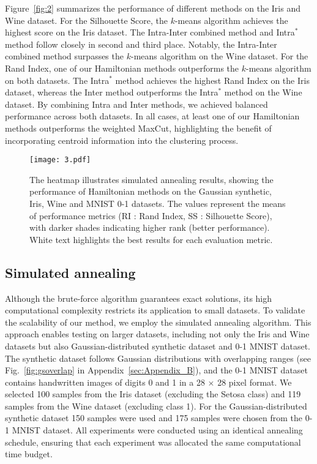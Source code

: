 \documentclass[showpacs,twocolumn,superscriptaddress]{revtex4-2}
\begin{document}
Figure~\ref{fig:2} summarizes the performance of different methods on the Iris and Wine dataset. For the Silhouette Score, the $k$-means algorithm achieves the highest score on the Iris dataset. The Intra-Inter combined method and Intra$^*$ method follow closely in second and third place. Notably, the Intra-Inter combined method surpasses the $k$-means algorithm on the Wine dataset. For the Rand Index, one of our Hamiltonian methods outperforms the $k$-means algorithm on both datasets. The Intra$^*$ method achieves the highest Rand Index on the Iris dataset, whereas the Inter method outperforms the Intra$^*$ method on the Wine dataset. By combining Intra and Inter methods, we achieved balanced performance across both datasets. In all cases, at least one of our Hamiltonian methods outperforms the weighted MaxCut, highlighting the benefit of incorporating centroid information into the clustering process.

\begin{figure}[t]
    \begin{center}
    \texttt{[image: 3.pdf]}    
    \end{center}
    \caption{The heatmap illustrates simulated annealing results, showing the performance of Hamiltonian methods on the Gaussian synthetic, Iris, Wine and MNIST 0-1 datasets. The values represent the means of performance metrics (RI : Rand Index, SS : Silhouette Score), with darker shades indicating higher rank (better performance). White text highlights the best results for each evaluation metric.}\label{fig:3}
\end{figure}
\subsection{Simulated annealing}
Although the brute-force algorithm guarantees exact solutions, its high computational complexity restricts its application to small datasets. To validate the scalability of our method, we employ the simulated annealing algorithm. This approach enables testing on larger datasets, including not only the Iris and Wine datasets but also Gaussian-distributed synthetic dataset and 0-1 MNIST dataset. The synthetic dataset follows Gaussian distributions with overlapping ranges (see Fig.~\ref{fig:gsoverlap} in Appendix~\ref{sec:Appendix_B}), and the 0-1 MNIST dataset contains handwritten images of digits 0 and 1 in a 28 $\times$ 28 pixel format. We selected 100 samples from the Iris dataset (excluding the Setosa class) and 119 samples from the Wine dataset (excluding class 1). For the Gaussian-distributed synthetic dataset 150 samples were used and 175 samples were chosen from the 0-1 MNIST dataset. All experiments were conducted using an identical annealing schedule, ensuring that each experiment was allocated the same computational time budget.
\end{document}
